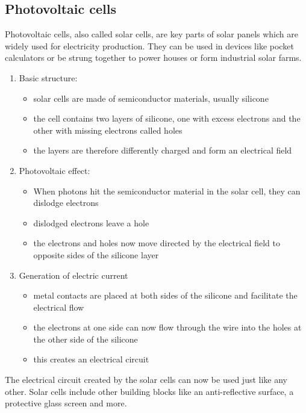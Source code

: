\documentclass{article}
\begin{document}
\subsection{Photovoltaic cells}\label{sec:pv}

Photovoltaic cells, also called solar cells, are key parts of solar panels which are widely used for electricity production. They can be used in devices like pocket calculators or be strung together to power houses or form industrial solar farms.\\

\begin{enumerate}
	\item Basic structure: \begin{itemize}
			\item solar cells are made of semiconductor materials, usually silicone
			\item the cell contains two layers of silicone, one with excess electrons and the other with missing electrons called holes
			\item the layers are therefore differently charged and form an electrical field
	\end{itemize}
	\item Photovoltaic effect: \begin{itemize}
		\item When photons hit the semiconductor material in the solar cell, they can dislodge electrons
		\item dislodged electrons leave a hole
		\item the electrons and holes now move directed by the electrical field to opposite sides of the silicone layer
	\end{itemize}
	\item Generation of electric current \begin{itemize}
		\item metal contacts are placed at both sides of the silicone and facilitate the electrical flow
		\item the electrons at one side can now flow through the wire into the holes at the other side of the silicone
		\item this creates an electrical circuit
	\end{itemize}
\end{enumerate}
The electrical circuit created by the solar cells can now be used just like any other. Solar cells include other building blocks like an anti-reflective surface, a protective glass screen and more. \citep{SolarCells}
\end{document}

